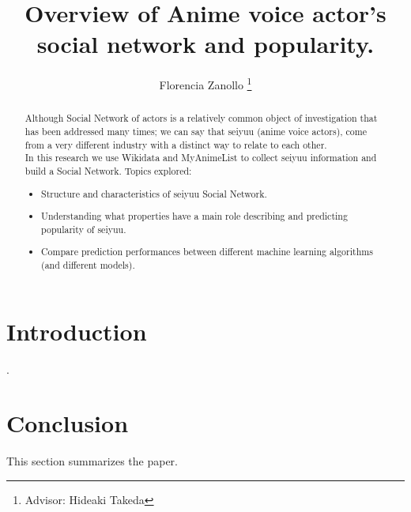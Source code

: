 \documentclass[journal, a4paper]{IEEEtran}
\begin{document}
	\title{Overview of Anime voice actor's social network and popularity.}
	\author{Florencia Zanollo
	\thanks{Advisor: Hideaki Takeda}}
	\maketitle

\begin{abstract}
	Although Social Network of actors is a relatively common object of investigation that has been addressed many times; we can say that seiyuu (anime voice actors), come from a very different industry with a distinct way to relate to each other. \\
	In this research we use Wikidata and MyAnimeList to collect seiyuu information and build a Social Network. Topics explored:
	\begin{itemize}
	\item Structure and characteristics of seiyuu Social Network.
	\item Understanding what properties have a main role describing and predicting popularity of seiyuu.
	\item Compare prediction performances between different machine learning algorithms (and different models).
	\end{itemize}
\end{abstract}

\section{Introduction}
	.





\section{Conclusion}
	This section summarizes the paper.
\end{document}
